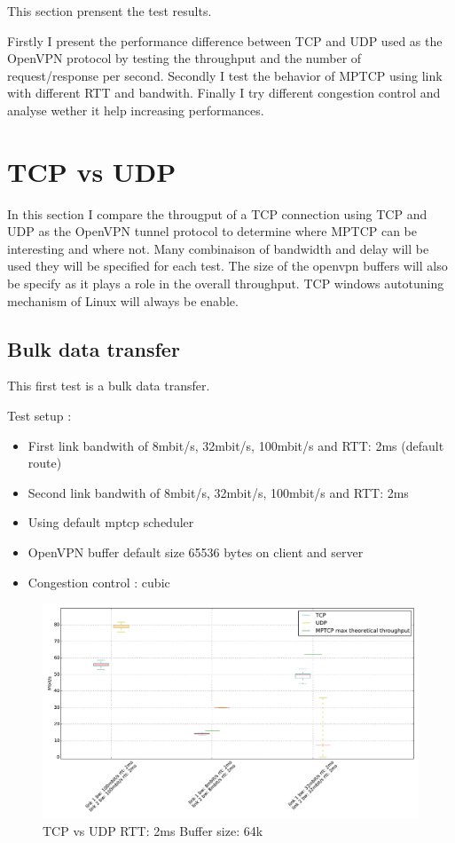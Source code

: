   This section prensent the test results.

  Firstly I  present the performance difference between TCP and UDP used as the OpenVPN protocol by testing the throughput and the number of request/response per second.
  Secondly I test the behavior of MPTCP using link with different RTT and bandwith.
  Finally I try different congestion control and analyse wether it help increasing performances.

 \section{TCP vs UDP}

  In this section I compare the througput of a TCP connection using TCP and UDP as the OpenVPN tunnel protocol to determine where MPTCP can be interesting and where not.
  Many combinaison of bandwidth and delay will be used they will be specified for each test.
  The size of the openvpn buffers will also be specify as it plays a role in the overall throughput.
  TCP windows autotuning mechanism of Linux will always be enable.

  \subsection{Bulk data transfer} \label{sec:bulk_data_transfer}

  This first test is a bulk data transfer.

  Test setup :

  \begin{itemize}
  \item First link bandwith of 8mbit/s, 32mbit/s, 100mbit/s  and RTT: 2ms (default route)
  \item Second link bandwith of 8mbit/s, 32mbit/s, 100mbit/s  and RTT: 2ms
  \item Using default mptcp scheduler
  \item OpenVPN buffer default size 65536 bytes on client and server
  \item Congestion control : cubic
  \end{itemize}

  \begin{figure}[h!]
    \centering
    \includegraphics[width=14cm]{../results/tcp_vs_udp_2ms.pdf}
    \caption{TCP vs UDP RTT: 2ms Buffer size: 64k}
    \label{all_tcp_vs_udp}
  \end{figure}

